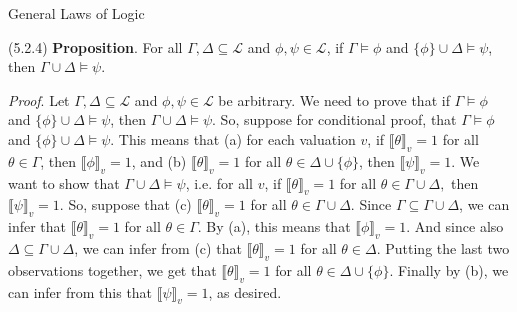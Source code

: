 \begin{frame}{General Laws of Logic}

		(5.2.4) \textbf{Proposition}. For all $\Gamma,\Delta\subseteq\mathcal{L}$ and $\phi,\psi\in\mathcal{L}$, if $\Gamma\vDash\phi$ and $\{\phi\}\cup\Delta\vDash\psi$, then $\Gamma\cup\Delta\vDash\psi$.
		
		\vspace{2ex}
		
		\emph{Proof}. Let $\Gamma,\Delta\subseteq\mathcal{L}$ and $\phi,\psi\in\mathcal{L}$ be arbitrary. We need to prove that  if $\Gamma\vDash\phi$ and $\{\phi\}\cup\Delta\vDash\psi$, then $\Gamma\cup\Delta\vDash\psi$. So, suppose for conditional proof, that $\Gamma\vDash\phi$ and $\{\phi\}\cup\Delta\vDash\psi$. This means that (a) for each valuation $v$, if $\llbracket\theta\rrbracket_v=1$ for all $\theta\in\Gamma$, then $\llbracket \phi\rrbracket_v=1$, and (b) $\llbracket\theta\rrbracket_v=1$ for all $\theta\in\Delta\cup\{\phi\}$, then $\llbracket \psi\rrbracket_v=1$. We want to show that $\Gamma\cup\Delta\vDash\psi$, i.e. for all $v$, if $\llbracket \theta\rrbracket_v=1$ for all $\theta\in\Gamma\cup\Delta,$ then $\llbracket\psi\rrbracket_v=1$. So, suppose that (c) $\llbracket \theta\rrbracket_v=1$ for all $\theta\in\Gamma\cup\Delta$. Since $\Gamma\subseteq \Gamma\cup \Delta$, we can infer that $\llbracket \theta\rrbracket_v=1$ for all $\theta\in\Gamma$. By (a), this means that $\llbracket \phi\rrbracket_v=1$. And since also $\Delta\subseteq \Gamma\cup \Delta$, we can infer from (c) that $\llbracket \theta\rrbracket_v=1$ for all $\theta\in\Delta$. Putting the last two observations together, we get that $\llbracket\theta\rrbracket_v=1$ for all $\theta\in\Delta\cup\{\phi\}$. Finally by (b), we can infer from this that $\llbracket\psi\rrbracket_v=1$, as desired.
	

\end{frame}

